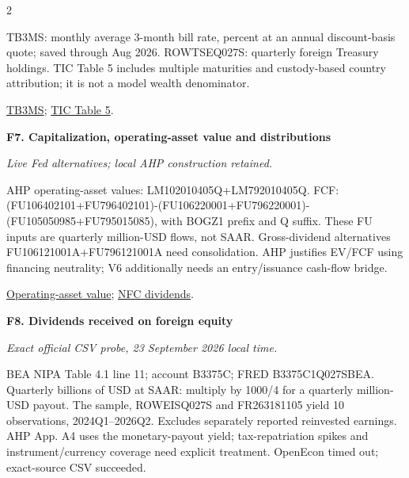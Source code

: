 \documentclass[10pt,a4paper,landscape]{article}
\begin{document}
\begin{multicols}{2}
\begin{minipage}{\linewidth}
TB3MS: monthly average 3-month bill rate, percent at an annual discount-basis quote; saved through Aug 2026. ROWTSEQ027S: quarterly foreign Treasury holdings. TIC Table 5 includes multiple maturities and custody-based country attribution; it is not a model wealth denominator.

\par \href{https://fred.stlouisfed.org/series/TB3MS}{TB3MS}; \href{https://ticdata.treasury.gov/Publish/slt_table5.html}{TIC Table 5}.

\end{minipage}\par\vspace{6pt}

\noindent\begin{minipage}{\linewidth}\raggedright

\hypertarget{src-F7}{\textbf{F7. Capitalization, operating-asset value and distributions}}\par

{\footnotesize\itshape Live Fed alternatives; local AHP construction retained.}\par

AHP operating-asset values: LM102010405Q+LM792010405Q. FCF: (FU106402101+FU796402101)-(FU106220001+FU796220001)-(FU105050985+FU795015085), with BOGZ1 prefix and Q suffix. These FU inputs are quarterly million-USD flows, not SAAR. Gross-dividend alternatives FU106121001A+FU796121001A need consolidation. AHP justifies EV/FCF using financing neutrality; V6 additionally needs an entry/issuance cash-flow bridge.

\par \href{https://fred.stlouisfed.org/series/BOGZ1LM102010405Q}{Operating-asset value}; \href{https://fred.stlouisfed.org/series/BOGZ1FU106121001A}{NFC dividends}.

\end{minipage}\par\vspace{6pt}

\noindent\begin{minipage}{\linewidth}\raggedright

\hypertarget{src-F8}{\textbf{F8. Dividends received on foreign equity}}\par

{\footnotesize\itshape Exact official CSV probe, 23 September 2026 local time.}\par

BEA NIPA Table 4.1 line 11; account B3375C; FRED B3375C1Q027SBEA. Quarterly billions of USD at SAAR: multiply by 1000/4 for a quarterly million-USD payout. The sample, ROWEISQ027S and FR263181105 yield 10 observations, 2024Q1--2026Q2. Excludes separately reported reinvested earnings. AHP App. A4 uses the monetary-payout yield; tax-repatriation spikes and instrument/currency coverage need explicit treatment. OpenEcon timed out; exact-source CSV succeeded.


\end{minipage}
\end{multicols}
\end{document}
